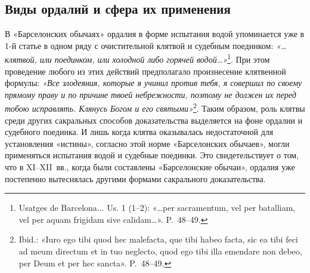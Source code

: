 \subsection{Виды ордалий и сфера их применения}

В «Барселонских обычаях» ордалия в форме испытания водой упоминается уже в 1-й статье в одном ряду с очистительной клятвой и судебным поединком: \emph{«…клятвой, или поединком, или холодной либо горячей водой…»}\footnote{Usatges de Barcelona... Us. 1 (1--2): «…per sacramentum, vel per batalliam, vel per aquam frigidam sive calidam…». P.~48--49.}. При этом проведение любого из этих действий предполагало произнесение клятвенной формулы: \emph{«Все злодеяния, которые я учинил против тебя, я совершил по своему прямому праву и по причине твоей небрежности, поэтому не должен их перед тобою исправлять. Клянусь Богом и его святыми»}\footnote{Ibid.: «Iuro ego tibi quod hec malefacta, que tibi habeo facta, sic ea tibi feci ad meum directum et in tuo neglecto, quod ego tibi illa emendare non debeo, per Deum et per hec sancta». P.~48--49.}. Таким образом, роль клятвы среди других сакральных способов доказательства выделяется на фоне ордалии и судебного поединка. И лишь когда клятва оказывалась недостаточной для установления «истины», согласно этой норме «Барселонских обычаев», могли применяться испытания водой и судебные поединки. Это свидетельствует о том, что в XI--XII~вв., когда были составлены «Барселонские обычаи», ордалия уже постепенно вытеснялась другими формами сакрального доказательства.

